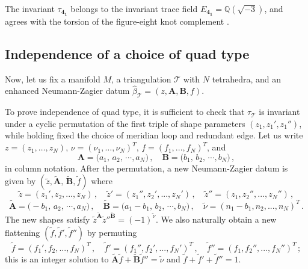 \documentclass[12pt]{amsart}
\newcommand{\lbl}{\label}
\renewcommand{\eta}{\nu}
\theoremstyle{definition}
\def\be{  \begin{equation} }
\def\ee{  \end{equation} }
\newcommand{\CT}{\mathcal{T}}
\newcommand{\wt}{\widetilde}
\newcommand{\mb}{\mathbf}
\numberwithin{equation}{section}
\begin{document}
The invariant $\tau_{\mb{4_1}}$ belongs to the invariant trace field 
$E_{\mb{4_1}} = \mathbb{Q}(\sqrt{-3})$, and agrees with the torsion of the 
figure-eight knot complement \cite{DFJ}.


\subsection{Independence of a choice of quad type}
\lbl{sec.invgauge}

Now, let us fix a manifold $M$, a triangulation $\CT$ with $N$ tetrahedra, and an enhanced Neumann-Zagier datum $\widehat\beta_\CT=(z,\mb A,\mb B,f)$.

To prove independence of quad type, it is sufficient to check that $\tau_\CT$ is invariant under a cyclic permutation of the first triple of shape parameters $(z_1,z_1',z_1'')$, while holding fixed the choice of meridian loop and redundant edge.
Let us write $z=(z_1,\dots,z_N)$, $\eta=(\eta_1,\dots,\eta_N)^T$, $f=(f_1,...,f_N)^T$, and 
%
\be \mb A = \big(a_1,\,a_2,\,\cdots,a_N\big)\,,\quad \mb B 
= \big(b_1,\,b_2,\,\cdots,b_N\big)\,,\ee
%
in column notation. After the permutation, a new Neumann-Zagier datum is given by
$(\wt z, \wt{\mb A} ,\,\wt {\mb B},\wt f )$ where
%
\be \wt z = (z_1',z_2,...,z_N)\,,\quad \wt z'=(z_1'',z_2',...,z_N')\,,
\quad \wt z'' = (z_1,z_2'',...,z_N'')\,,\ee
%
%
\be \wt{\mb A} = \big(-b_1,\,a_2,\,\cdots,a_N\big)\,,\quad \wt{\mb B} 
= \big(a_1-b_1,\,b_2,\,\cdots,b_N\big)\,,\quad  \wt 
\eta = (n_1-b_1,n_2,...,n_N)^T\,.
\ee
%
The new shapes satisfy 
$\wt z^{\tilde{\mb A}}\wt z''^{\tilde{\mb B}}=(-1)^{\tilde \eta}$.
%
We also naturally obtain a new flattening $(\wt f,\wt f',\wt f'')$ by permuting
%
\be \wt f=(f_1',f_2,...,f_N)^T\,,\quad \wt f'=(f_1'',f_2',...,f_N')^T\,,
\quad \wt f''=(f_1,f_2'',...,f_N'')^T\,; \ee
%
this is an integer solution to 
$\wt{\mb A}\tilde f+\wt{\mb B}\tilde f''= \wt \eta$ and 
$\tilde f+\tilde f'+\tilde f''=1$.  
\end{document}
